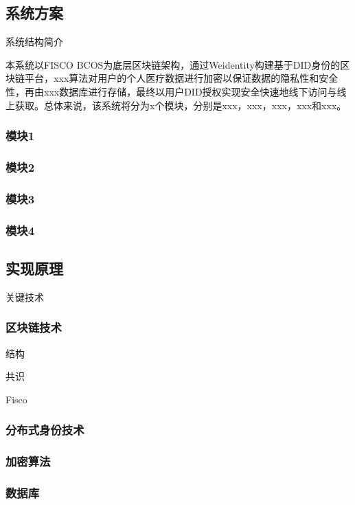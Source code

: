 \documentclass{cumcmthesis}
\numberwithin{equation}{section} %
\numberwithin{figure}{section} %
\numberwithin{table}{section} %
\begin{document}
\subsection{系统方案}

系统结构简介

本系统以FISCO BCOS为底层区块链架构，通过Weidentity构建基于DID身份的区块链平台，xxx算法对用户的个人医疗数据进行加密以保证数据的隐私性和安全性，再由xxx数据库进行存储，最终以用户DID授权实现安全快速地线下访问与线上获取。总体来说，该系统将分为x个模块，分别是xxx，xxx，xxx，xxx和xxx。

\subsubsection{模块1}

\subsubsection{模块2}

\subsubsection{模块3}

\subsubsection{模块4}

\subsection{实现原理}

关键技术

\subsubsection{区块链技术}

结构

共识

Fisco

\subsubsection{分布式身份技术}

\subsubsection{加密算法}

\subsubsection{数据库}
\end{document}
